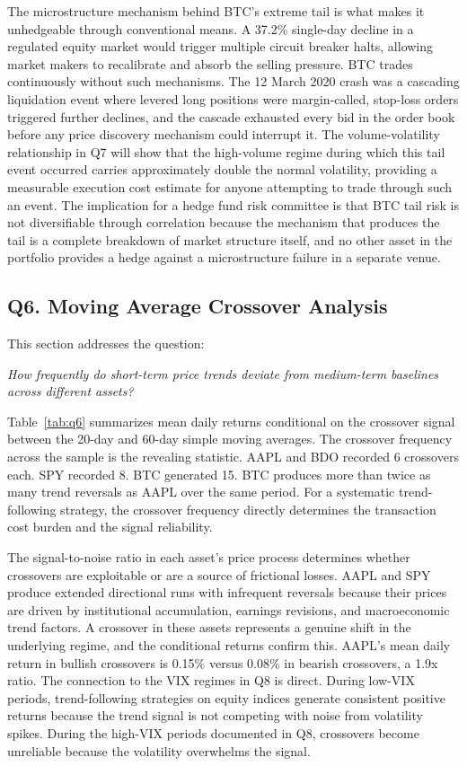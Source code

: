 The microstructure mechanism behind BTC's extreme tail is what makes it unhedgeable through conventional means. A 37.2\% single-day decline in a regulated equity market would trigger multiple circuit breaker halts, allowing market makers to recalibrate and absorb the selling pressure. BTC trades continuously without such mechanisms. The 12 March 2020 crash was a cascading liquidation event where levered long positions were margin-called, stop-loss orders triggered further declines, and the cascade exhausted every bid in the order book before any price discovery mechanism could interrupt it. The volume-volatility relationship in Q7 will show that the high-volume regime during which this tail event occurred carries approximately double the normal volatility, providing a measurable execution cost estimate for anyone attempting to trade through such an event. The implication for a hedge fund risk committee is that BTC tail risk is not diversifiable through correlation because the mechanism that produces the tail is a complete breakdown of market structure itself, and no other asset in the portfolio provides a hedge against a microstructure failure in a separate venue.

\subsection{Q6. Moving Average Crossover Analysis}

This section addresses the question:

\noindent\textit{How frequently do short-term price trends deviate from medium-term baselines across different assets?}



Table~\ref{tab:q6} summarizes mean daily returns conditional on the crossover signal between the 20-day and 60-day simple moving averages. The crossover frequency across the sample is the revealing statistic. AAPL and BDO recorded 6 crossovers each. SPY recorded 8. BTC generated 15. BTC produces more than twice as many trend reversals as AAPL over the same period. For a systematic trend-following strategy, the crossover frequency directly determines the transaction cost burden and the signal reliability.

The signal-to-noise ratio in each asset's price process determines whether crossovers are exploitable or are a source of frictional losses. AAPL and SPY produce extended directional runs with infrequent reversals because their prices are driven by institutional accumulation, earnings revisions, and macroeconomic trend factors. A crossover in these assets represents a genuine shift in the underlying regime, and the conditional returns confirm this. AAPL's mean daily return in bullish crossovers is 0.15\% versus 0.08\% in bearish crossovers, a 1.9x ratio. The connection to the VIX regimes in Q8 is direct. During low-VIX periods, trend-following strategies on equity indices generate consistent positive returns because the trend signal is not competing with noise from volatility spikes. During the high-VIX periods documented in Q8, crossovers become unreliable because the volatility overwhelms the signal.

